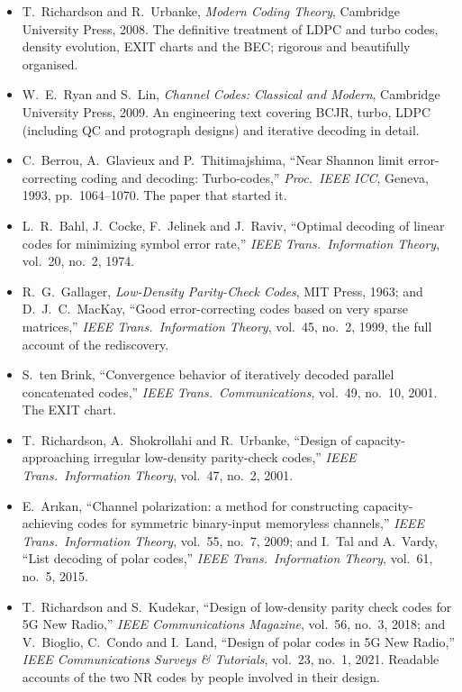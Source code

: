 \furtherreading
\begin{itemize}
\item T.~Richardson and R.~Urbanke, \emph{Modern Coding Theory}, Cambridge University Press, 2008.
The definitive treatment of LDPC and turbo codes, density evolution, EXIT charts and the BEC; rigorous
and beautifully organised.
\item W.~E.~Ryan and S.~Lin, \emph{Channel Codes: Classical and Modern}, Cambridge University Press,
2009. An engineering text covering BCJR, turbo, LDPC (including QC and protograph designs) and
iterative decoding in detail.
\item C.~Berrou, A.~Glavieux and P.~Thitimajshima, ``Near Shannon limit error-correcting coding and
decoding: Turbo-codes,'' \emph{Proc.\ IEEE ICC}, Geneva, 1993, pp.~1064--1070. The paper that started it.
\item L.~R.~Bahl, J.~Cocke, F.~Jelinek and J.~Raviv, ``Optimal decoding of linear codes for minimizing
symbol error rate,'' \emph{IEEE Trans.\ Information Theory}, vol.~20, no.~2, 1974.
\item R.~G.~Gallager, \emph{Low-Density Parity-Check Codes}, MIT Press, 1963; and D.~J.~C.~MacKay,
``Good error-correcting codes based on very sparse matrices,'' \emph{IEEE Trans.\ Information Theory},
vol.~45, no.~2, 1999, the full account of the rediscovery.
\item S.~ten Brink, ``Convergence behavior of iteratively decoded parallel concatenated codes,''
\emph{IEEE Trans.\ Communications}, vol.~49, no.~10, 2001. The EXIT chart.
\item T.~Richardson, A.~Shokrollahi and R.~Urbanke, ``Design of capacity-approaching irregular
low-density parity-check codes,'' \emph{IEEE Trans.\ Information Theory}, vol.~47, no.~2, 2001.
\item E.~Ar\i kan, ``Channel polarization: a method for constructing capacity-achieving codes for
symmetric binary-input memoryless channels,'' \emph{IEEE Trans.\ Information Theory}, vol.~55, no.~7,
2009; and I.~Tal and A.~Vardy, ``List decoding of polar codes,'' \emph{IEEE Trans.\ Information
Theory}, vol.~61, no.~5, 2015.
\item T.~Richardson and S.~Kudekar, ``Design of low-density parity check codes for 5G New Radio,''
\emph{IEEE Communications Magazine}, vol.~56, no.~3, 2018; and V.~Bioglio, C.~Condo and I.~Land,
``Design of polar codes in 5G New Radio,'' \emph{IEEE Communications Surveys \& Tutorials}, vol.~23,
no.~1, 2021. Readable accounts of the two NR codes by people involved in their design.

\end{itemize}
